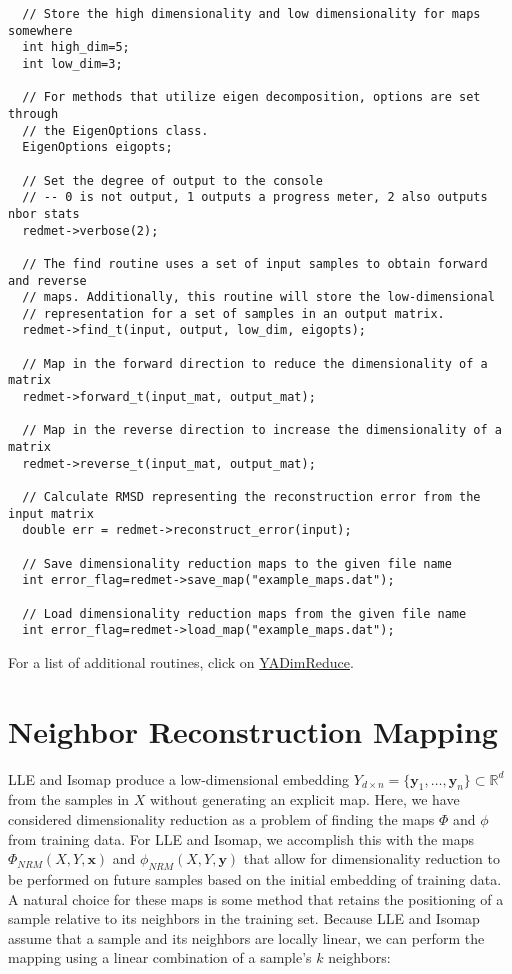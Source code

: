\footnotesize\begin{verbatim}  // Store the high dimensionality and low dimensionality for maps somewhere
  int high_dim=5;
  int low_dim=3;
  
  // For methods that utilize eigen decomposition, options are set through
  // the EigenOptions class.
  EigenOptions eigopts;
  
  // Set the degree of output to the console
  // -- 0 is not output, 1 outputs a progress meter, 2 also outputs nbor stats
  redmet->verbose(2);

  // The find routine uses a set of input samples to obtain forward and reverse
  // maps. Additionally, this routine will store the low-dimensional 
  // representation for a set of samples in an output matrix. 
  redmet->find_t(input, output, low_dim, eigopts);
  
  // Map in the forward direction to reduce the dimensionality of a matrix
  redmet->forward_t(input_mat, output_mat);
  
  // Map in the reverse direction to increase the dimensionality of a matrix
  redmet->reverse_t(input_mat, output_mat);
  
  // Calculate RMSD representing the reconstruction error from the input matrix
  double err = redmet->reconstruct_error(input);  
    
  // Save dimensionality reduction maps to the given file name
  int error_flag=redmet->save_map("example_maps.dat");
  
  // Load dimensionality reduction maps from the given file name
  int error_flag=redmet->load_map("example_maps.dat");
\end{verbatim}
\normalsize


For a list of additional routines, click on \hyperlink{class_y_a_dim_reduce}{YADim\-Reduce}.

\par
 \par
 \hypertarget{index_nbors}{}\section{Neighbor Reconstruction Mapping}\label{index_nbors}
LLE and Isomap produce a low-dimensional embedding $Y_{d \times n} = \{\mathbf{y}_1, \dots, \mathbf{y}_n \} \subset \mathbb{R}^d$ from the samples in $X$ without generating an explicit map. Here, we have considered dimensionality reduction as a problem of finding the maps $\Phi$ and $\phi$ from training data. For LLE and Isomap, we accomplish this with the maps $\Phi_{NRM}(X,Y,\mathbf{x})$ and $\phi_{NRM}(X,Y,\mathbf{y})$ that allow for dimensionality reduction to be performed on future samples based on the initial embedding of training data. A natural choice for these maps is some method that retains the positioning of a sample relative to its neighbors in the training set. Because LLE and Isomap assume that a sample and its neighbors are locally linear, we can perform the mapping using a linear combination of a sample's $k$ neighbors:

